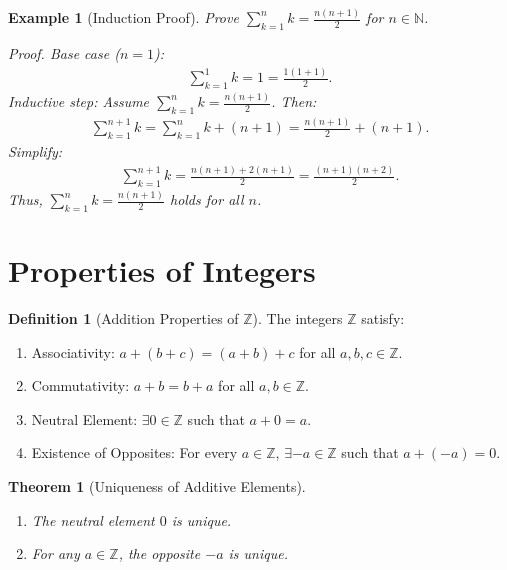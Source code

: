 \documentclass[9pt]{article}
\theoremstyle{definition}
\newtheorem{definition}{Definition}
\theoremstyle{plain}
\newtheorem{theorem}{Theorem}
\newtheorem{example}{Example}
\begin{document}
\begin{example}[Induction Proof]
Prove $ \sum_{k=1}^n k = \frac{n(n+1)}{2} $ for $ n \in \mathbb{N} $.

{Proof.} Base case ($ n=1 $):
\begin{align}
\sum_{k=1}^1 k = 1 = \frac{1(1+1)}{2}.
\end{align}
Inductive step: Assume $ \sum_{k=1}^n k = \frac{n(n+1)}{2} $. Then:
\begin{align}
\sum_{k=1}^{n+1} k = \sum_{k=1}^n k + (n+1) = \frac{n(n+1)}{2} + (n+1).
\end{align}
Simplify:
\begin{align}
\sum_{k=1}^{n+1} k = \frac{n(n+1) + 2(n+1)}{2} = \frac{(n+1)(n+2)}{2}.
\end{align}
Thus, $ \sum_{k=1}^n k = \frac{n(n+1)}{2} $ holds for all $ n $.
\end{example}

\section*{Properties of Integers}
\begin{definition}[Addition Properties of $ \mathbb{Z} $]
The integers $ \mathbb{Z} $ satisfy:
\begin{enumerate}[label=(A\arabic*)]
    \item {Associativity:} $ a + (b + c) = (a + b) + c $ for all $ a, b, c \in \mathbb{Z} $.
    \item {Commutativity:} $ a + b = b + a $ for all $ a, b \in \mathbb{Z} $.
    \item {Neutral Element:} $ \exists 0 \in \mathbb{Z} $ such that $ a + 0 = a $.
    \item {Existence of Opposites:} For every $ a \in \mathbb{Z} $, $ \exists -a \in \mathbb{Z} $ such that $ a + (-a) = 0 $.
\end{enumerate}
\end{definition}

\begin{theorem}[Uniqueness of Additive Elements]
\begin{enumerate}
    \item The neutral element $ 0 $ is unique.
    \item For any $ a \in \mathbb{Z} $, the opposite $ -a $ is unique.
\end{enumerate}
\end{theorem}
\end{document}
